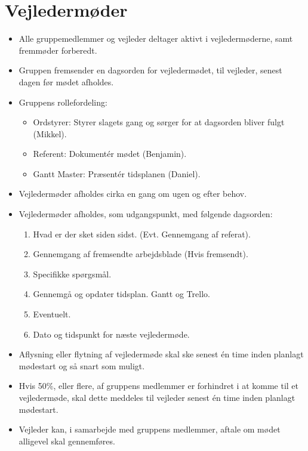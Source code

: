 \documentclass[11pt]{article}
\begin{document}
\section{Vejledermøder}
\begin{itemize}
    \item Alle gruppemedlemmer og vejleder deltager aktivt i vejledermøderne, samt fremmøder forberedt.
    \item Gruppen fremsender en dagsorden for vejledermødet, til vejleder, senest dagen før mødet afholdes.
    \item Gruppens rollefordeling:
    \begin{itemize}
        \item Ordstyrer: Styrer slagets gang og sørger for at dagsorden bliver fulgt (Mikkel).
        \item Referent: Dokumentér mødet (Benjamin).
        \item Gantt Master: Præsentér tidsplanen (Daniel).
    \end{itemize}
    \item Vejledermøder afholdes cirka en gang om ugen og efter behov.
    \item Vejledermøder afholdes, som udgangspunkt, med følgende dagsorden:
    \begin{enumerate}
        \item Hvad er der sket siden sidst. (Evt. Gennemgang af referat).
        \item Gennemgang af fremsendte arbejdsblade (Hvis fremsendt).
        \item Specifikke spørgsmål.
        \item Gennemgå og opdater tidsplan. Gantt og Trello.
        \item Eventuelt.
        \item Dato og tidspunkt for næste vejledermøde.
    \end{enumerate}
    \item Aflysning eller flytning af vejledermøde skal ske senest én time inden planlagt mødestart og så snart som muligt.
    \item Hvis 50\%, eller flere, af gruppens medlemmer er forhindret i at komme til et vejledermøde, skal dette meddeles til vejleder senest én time inden planlagt mødestart.
    \item Vejleder kan, i samarbejde med gruppens medlemmer, aftale om mødet alligevel skal gennemføres.
\end{itemize}
\end{document}
